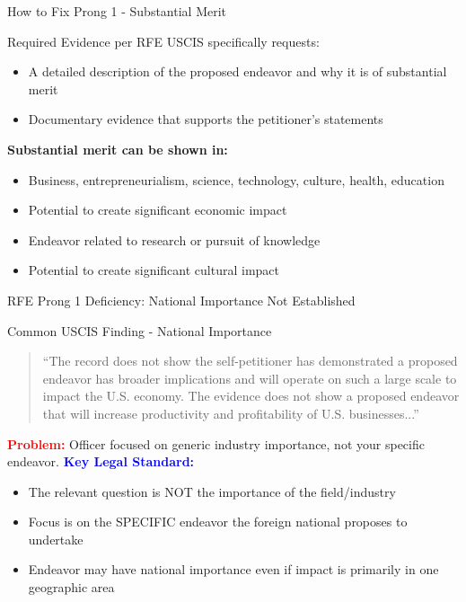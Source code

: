 \documentclass[11pt]{beamer}
\begin{document}
	\begin{frame}{How to Fix Prong 1 - Substantial Merit}
		\scriptsize
		\begin{block}{Required Evidence per RFE}
			USCIS specifically requests:
			\begin{itemize}
				\item A detailed description of the proposed endeavor and why it is of substantial merit
				\item Documentary evidence that supports the petitioner's statements
			\end{itemize}
			\textbf{Substantial merit can be shown in:}
			\begin{itemize}
				\item Business, entrepreneurialism, science, technology, culture, health, education
				\item Potential to create significant economic impact
				\item Endeavor related to research or pursuit of knowledge
				\item Potential to create significant cultural impact
			\end{itemize}
		\end{block}
	\end{frame}
	
	
	\begin{frame}{RFE Prong 1 Deficiency: National Importance Not Established}
		\scriptsize
		\begin{block}{Common USCIS Finding - National Importance}
			\begin{quote}
				``The record does not show the self-petitioner has demonstrated a proposed endeavor has broader implications and will operate on such a large scale to impact the U.S. economy. The evidence does not show a proposed endeavor that will increase productivity and profitability of U.S. businesses...''
			\end{quote}
			\textcolor{red}{\textbf{Problem:}} Officer focused on generic industry importance, not your specific endeavor.
			\vspace{0.2cm}
			\textcolor{blue}{\textbf{Key Legal Standard:}} 
			\begin{itemize}
				\item The relevant question is NOT the importance of the field/industry
				\item Focus is on the SPECIFIC endeavor the foreign national proposes to undertake
				\item Endeavor may have national importance even if impact is primarily in one geographic area
			\end{itemize}
		\end{block}
	\end{frame}
	
\end{document}
